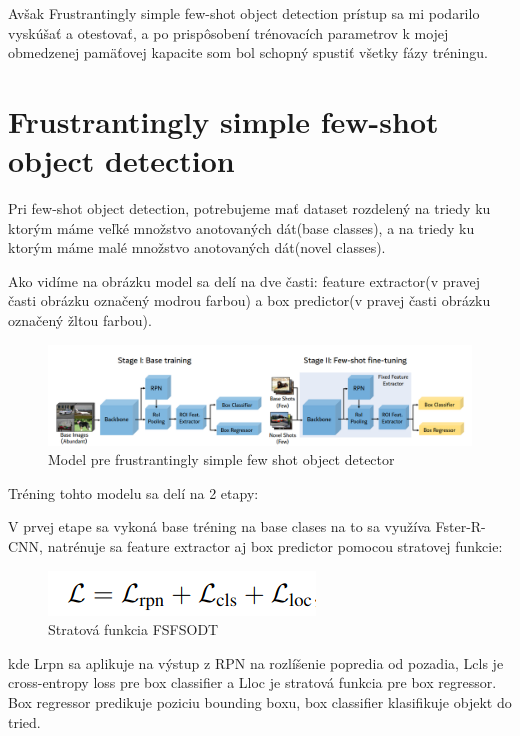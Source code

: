 Avšak Frustrantingly simple few-shot object detection prístup sa mi podarilo vyskúšať a otestovať, a po prispôsobení trénovacích parametrov k mojej obmedzenej pamäťovej kapacite som bol schopný spustiť všetky fázy tréningu. 

\section{Frustrantingly simple few-shot object detection}
Pri few-shot object detection, potrebujeme mať dataset rozdelený na triedy ku ktorým máme veľké množstvo anotovaných dát(base classes), a na triedy ku ktorým máme malé množstvo anotovaných dát(novel classes).

Ako vidíme na obrázku model sa delí na dve časti: feature extractor(v pravej časti obrázku označený modrou farbou) a box predictor(v pravej časti obrázku označený žltou farbou). 

\begin{figure}[!hbt]
\includegraphics[width=\textwidth]{images/FSFSOD_model.png}
\caption{Model pre frustrantingly simple few shot object detector}
\label{fig:image}
\end{figure}

Tréning tohto modelu sa delí na 2 etapy: 

V prvej etape sa vykoná base tréning na base clases na to sa využíva Fster-R-CNN, natrénuje sa feature extractor aj box predictor pomocou stratovej funkcie: 

\begin{figure}[!hbt]
\includegraphics[width=\textwidth]{images/FSFSOD_loss.png}
\caption{Stratová funkcia FSFSODT}
\label{fig:image}
\end{figure}

kde Lrpn sa aplikuje na výstup z RPN na rozlíšenie popredia od pozadia, Lcls je cross-entropy loss pre box classifier a Lloc je stratová funkcia pre box regressor. Box regressor predikuje poziciu bounding boxu, box classifier klasifikuje objekt do tried.

